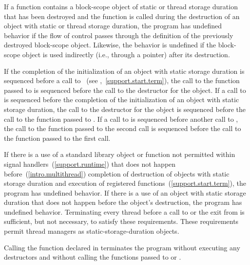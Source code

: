 \pnum
If a function contains a block-scope object of static or thread storage duration that has been
destroyed and the function is called during the destruction of an object with static or
thread storage duration, the program has undefined behavior if the flow of control
passes through the definition of the previously destroyed block-scope object. Likewise, the
behavior is undefined if the block-scope object is used indirectly (i.e., through a
pointer) after its destruction.

\pnum
{}%
%
If the completion of the initialization of an object with static storage
duration is sequenced before a call to ~(see
,~\ref{support.start.term}), the call to the function passed to
 is sequenced before the call to the destructor for the object. If a
call to  is sequenced before the completion of the initialization of
an object with static storage duration, the call to the destructor for the
object is sequenced before the call to the function passed to . If a
call to  is sequenced before another call to , the
call to the function passed to the second  call is sequenced before
the call to the function passed to the first  call.

\pnum
If there is a use of a standard library object or function not permitted within signal
handlers~(\ref{support.runtime}) that does not happen before~(\ref{intro.multithread})
completion of destruction of objects with static storage duration and execution of
 registered functions~(\ref{support.start.term}), the program has
undefined behavior. \enternote If there is a use of an object with static storage
duration that does not happen before the object's destruction, the program has undefined
behavior. Terminating every thread before a call to  or the exit from
 is sufficient, but not necessary, to satisfy these requirements. These
requirements permit thread managers as static-storage-duration objects. \exitnote

\pnum
{}%
%
%
Calling the function  declared in
%
 terminates the program without executing any destructors
and without calling
the functions passed to  or .%

